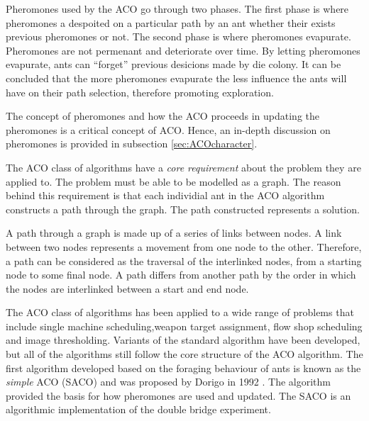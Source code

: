 Pheromones used by the ACO go through two phases. The first phase is where pheromones a despoited on a particular path by an ant whether their exists previous pheromones or not. The second phase is where pheromones evapurate. Pheromones are not permenant and deteriorate over time\cite{FundamentalSwarm}. By letting pheromones evapurate, ants can ``forget'' previous desicions made by die colony\cite{FundamentalSwarm}. It can be concluded that the more pheromones evapurate the less influence the ants will have on their path selection, therefore promoting exploration\cite{FundamentalSwarm}.

The concept of pheromones and how the ACO proceeds in updating the pheromones is a critical concept of ACO. Hence, an in-depth discussion on pheromones is provided in subsection \ref{sec:ACOcharacter}.

The ACO class of algorithms have a \emph{core requirement} about the problem they are applied to\cite{FundamentalSwarm}. The problem must be able to be modelled as a graph. The reason behind this requirement is that each individial ant in the ACO algorithm constructs a path through the graph\cite{FundamentalSwarm}. The path constructed represents a solution.

A path through a graph is made up of a series of links between nodes\cite{AIModernApproach,DataStructuresJava}. A link between two nodes represents a movement from one node to the other\cite{AIModernApproach,DataStructuresJava}. Therefore, a path can be considered as the traversal of the interlinked nodes, from a starting node to some final node\cite{AIModernApproach,DataStructuresJava}. A path differs from another path by the order in which the nodes are interlinked between a start and end node\cite{AIModernApproach,DataStructuresJava}.

 The ACO class of algorithms has been applied to a wide range of problems that include single machine scheduling\cite{ACOSingleMachine},weapon target assignment\cite{WeaponTargetACO}, flow shop scheduling\cite{ACOFlowShop} and image thresholding\cite{ACOImageThreshold}. Variants of the standard algorithm have been developed, but all of the algorithms still follow the core structure of the ACO algorithm\cite{CompuIntelligenceIntro,FundamentalSwarm}.
The first algorithm developed based on the foraging behaviour of ants is known as the \emph{simple} ACO (SACO) and was proposed by Dorigo in 1992 \cite{CompuIntelligenceIntro}. The algorithm provided the basis for how pheromones are used and updated. The SACO is an algorithmic implementation of the double bridge experiment.

